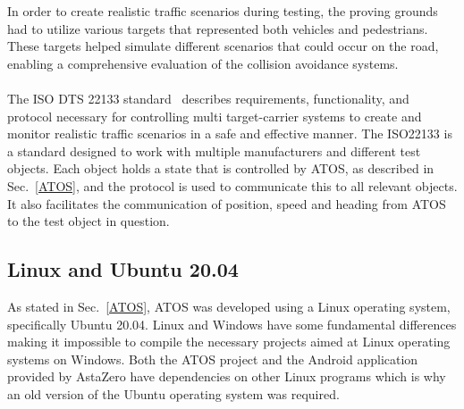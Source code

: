 In order to create realistic traffic scenarios during testing, the proving grounds had to utilize various targets that represented both vehicles and pedestrians. These targets helped simulate different scenarios that could occur on the road, enabling a comprehensive evaluation of the collision avoidance systems.
\\ \\
The ISO DTS 22133 standard~\cite{iso22133} describes requirements, functionality, and protocol necessary for controlling multi target-carrier systems to create and monitor realistic traffic scenarios in a safe and effective manner. The ISO22133 is a standard designed to work with multiple manufacturers and different test objects. Each object holds a state that is controlled by ATOS, as described in Sec.~\ref{ATOS}, and the protocol is used to communicate this to all relevant objects. It also facilitates the communication of position, speed and heading from ATOS to the test object in question.

\subsection{Linux and Ubuntu 20.04} \label{Linux}
As stated in Sec.~\ref{ATOS}, ATOS was developed using a Linux operating system, specifically Ubuntu 20.04. Linux and Windows have some fundamental differences making it impossible to compile the necessary projects aimed at Linux operating systems on Windows. Both the ATOS project and the Android application provided by AstaZero have dependencies on other Linux programs which is why an old version of the Ubuntu operating system was required.

